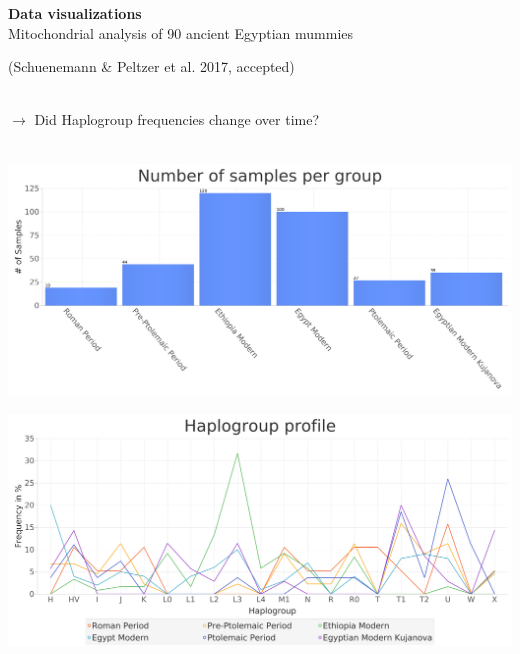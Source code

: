 \documentclass[a0paper,portrait]{baposter}
\begin{document}
\begin{poster}
{\textbf{Data visualizations}\\
Mitochondrial analysis of 90 ancient Egyptian mummies \begin{footnotesize}(Schuenemann \& Peltzer et al. 2017, accepted)\end{footnotesize}\\
$\rightarrow$ Did Haplogroup frequencies change over time?\\
\\
	\begin{minipage}{0.5\textwidth}
		\includegraphics[width=\textwidth]{figures/group_sizes2.png}
	\end{minipage}
	\begin{minipage}{0.5\textwidth}
			\includegraphics[width=\textwidth]{figures/profile.png}
	\end{minipage}

}
\end{poster}
\end{document}
